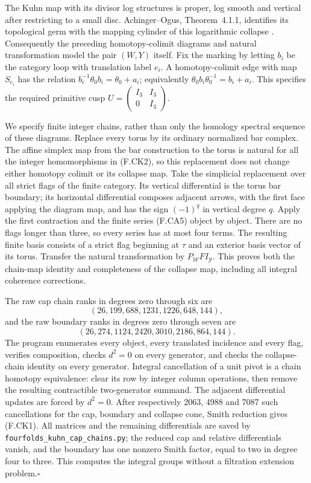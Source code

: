 The Kuhn map with its divisor log structures is proper,
log smooth and vertical after restricting to a small disc.
Achinger--Ogus, Theorem~4.1.1, identifies its topological germ
with the mapping cylinder of this logarithmic collapse
\cite{ffAchingerOgus20}.  Consequently the preceding
homotopy-colimit diagrams and natural transformation model
the pair $(W,Y)$ itself.  Fix the marking by letting $b_i$
be the category loop with translation label $e_i$.  A
homotopy-colimit edge with map $S_{e_i}$ has the relation
$b_i^{-1}\theta_0b_i=\theta_0+a_i$; equivalently
$\theta_0b_i\theta_0^{-1}=b_i+a_i$.  This specifies the
required primitive cusp
$U=\begin{pmatrix}I_3&I_3\\0&I_3\end{pmatrix}$.

We specify finite integer chains, rather than only the
homology spectral sequence of these diagrams.  Replace every
torus by its ordinary normalized bar complex.  The affine
simplex map from the bar construction to the torus is natural
for all the integer homomorphisms in (F.CK2), so this replacement
does not change either homotopy colimit or its collapse map.
Take the simplicial replacement over all strict flags of the
finite category.  Its vertical differential is the torus bar
boundary; its horizontal differential composes adjacent
arrows, with the first face applying the diagram map, and
has the sign $(-1)^q$ in vertical degree $q$.
Apply the first contraction and the finite series (F.CA5)
object by object.  There are no flags longer than three,
so every series has at most four terms.  The resulting
finite basis consists of a strict flag beginning at $\tau$
and an exterior basis vector of its torus.  Transfer the
natural transformation by $P_{\mathcal W}FI_{\mathcal Y}$.
This proves both the chain-map identity and completeness of
the collapse map, including all integral coherence corrections.

The raw cap chain ranks in degrees zero through six are
\[
 (26,199,688,1231,1226,648,144),
\]
and the raw boundary ranks in degrees zero through seven are
\[
 (26,274,1124,2420,3010,2186,864,144).
\]
The program enumerates every object, every translated
incidence and every flag, verifies composition, checks
$d^2=0$ on every generator, and checks the collapse-chain
identity on every generator.  Integral cancellation of a
unit pivot is a chain homotopy equivalence: clear its row by
integer column operations, then remove the resulting
contractible two-generator summand.  The adjacent differential
updates are forced by $d^2=0$.  After respectively 2063,
4988 and 7087 such cancellations for the cap, boundary and
collapse cone, Smith reduction gives (F.CK1).  All matrices
and the remaining differentials are saved by
\texttt{fourfolds\_kuhn\_cap\_chains.py}; the reduced cap and
relative differentials vanish, and the boundary has one
nonzero Smith factor, equal to two in degree four to three.
This computes the integral groups without a filtration
extension problem.\hfill$\square$

